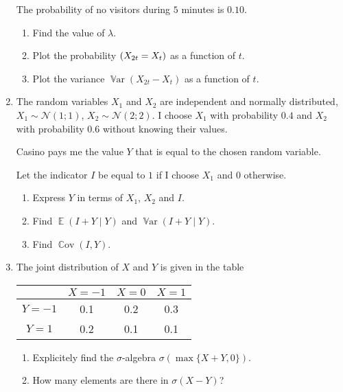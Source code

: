 \documentclass[12pt]{article}
\DeclareMathOperator{\Cov}{\mathbb{C}ov}
\DeclareMathOperator{\Var}{\mathbb{V}ar}
\let\P\relax
\DeclareMathOperator{\P}{\mathbb{P}}
\DeclareMathOperator{\E}{\mathbb{E}}
\newcommand \cN{\mathcal{N}}
\begin{document}
\begin{enumerate}
  The probability of no visitors during $5$ minutes is $0.10$. 
  
  \begin{enumerate}
    \item Find the value of $\lambda$.
    \item Plot the probability $\P(X_{2t} = X_{t})$ as a function of $t$.
    \item Plot the variance $\Var(X_{2t} - X_{t})$ as a function of $t$.
  \end{enumerate}

  \item 
  The random variables $X_1$ and $X_2$ are independent and normally distributed, 
  $X_1 \sim \cN(1;1)$, $X_2 \sim \cN(2;2)$. 
  I choose $X_1$ with probability $0.4$ and $X_2$ with probability $0.6$ without knowing their values.
  
  Casino pays me the value $Y$ that is equal to the chosen random variable. 

  Let the indicator $I$ be equal to $1$ if I choose $X_1$ and $0$ otherwise. 

  \begin{enumerate}
    \item Express $Y$ in terms of $X_1$, $X_2$ and $I$.
    \item Find $\E(I +Y \mid Y)$ and $\Var(I +Y \mid Y)$.
    \item Find $\Cov(I, Y)$.
  \end{enumerate}

  \item The joint distribution of $X$ and $Y$ is given in the table
    
    \begin{tabular}{*{4}{c}}
    \toprule
    & $X=-1$ & $X=0$ & $X=1$ \\
    \midrule
    $Y=-1$ & 0.1 & 0.2 & 0.3  \\
    $Y=1$ & 0.2 & 0.1 & 0.1  \\
    \bottomrule
    \end{tabular}
    
    \begin{enumerate}
     \item Explicitely find the $\sigma$-algebra $\sigma(\max\{X+Y, 0\})$.
     \item How many elements are there in $\sigma(X - Y)$?
    \end{enumerate}
    
\end{enumerate}
\end{document}
